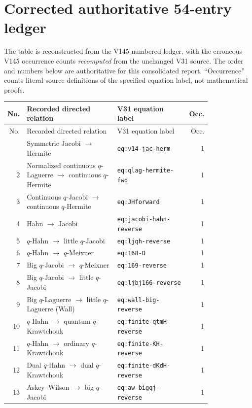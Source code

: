 \documentclass[10pt]{article}
\begin{document}
\section{Corrected authoritative 54-entry ledger}
The table is reconstructed from the V145 numbered ledger, with the erroneous V145 occurrence counts \emph{recomputed} from the unchanged V31 source. The order and numbers below are authoritative for this consolidated report. ``Occurrence'' counts literal source definitions of the specified equation label, not mathematical proofs.
\begingroup\footnotesize
\begin{longtable}{@{}r p{0.46\linewidth} p{0.36\linewidth} r@{}}
\toprule No. & Recorded directed relation & V31 equation label & Occ.\\
\midrule\endfirsthead
\toprule No. & Recorded directed relation & V31 equation label & Occ.\\
\midrule\endhead
\bottomrule\endfoot
1 & Symmetric Jacobi $\ensuremath{\to}$ Hermite & \texttt{eq:v14-jac-herm} & 1 \\
2 & Normalized continuous $q$-Laguerre $\ensuremath{\to}$ continuous $q$-Hermite & \texttt{eq:qlag-hermite-fwd} & 1 \\
3 & Continuous $q$-Jacobi $\ensuremath{\to}$ continuous $q$-Hermite & \texttt{eq:JHforward} & 1 \\
4 & Hahn $\ensuremath{\to}$ Jacobi & \texttt{eq:jacobi-hahn-reverse} & 1 \\
5 & $q$-Hahn $\ensuremath{\to}$ little $q$-Jacobi & \texttt{eq:ljqh-reverse} & 1 \\
6 & $q$-Hahn $\ensuremath{\to}$ $q$-Meixner & \texttt{eq:168-D} & 1 \\
7 & Big $q$-Jacobi $\ensuremath{\to}$ $q$-Meixner & \texttt{eq:169-reverse} & 1 \\
8 & Big $q$-Jacobi $\ensuremath{\to}$ little $q$-Jacobi & \texttt{eq:ljbj166-reverse} & 1 \\
9 & Big $q$-Laguerre $\ensuremath{\to}$ little $q$-Laguerre (Wall) & \texttt{eq:wall-big-reverse} & 1 \\
10 & $q$-Hahn $\ensuremath{\to}$ quantum $q$-Krawtchouk & \texttt{eq:finite-qtmH-reverse} & 1 \\
11 & $q$-Hahn $\ensuremath{\to}$ ordinary $q$-Krawtchouk & \texttt{eq:finite-KH-reverse} & 1 \\
12 & Dual $q$-Hahn $\ensuremath{\to}$ dual $q$-Krawtchouk & \texttt{eq:finite-dKdH-reverse} & 1 \\
13 & Askey--Wilson $\ensuremath{\to}$ big $q$-Jacobi & \texttt{eq:aw-bigqj-reverse} & 1 \\

\end{longtable}
\end{document}

